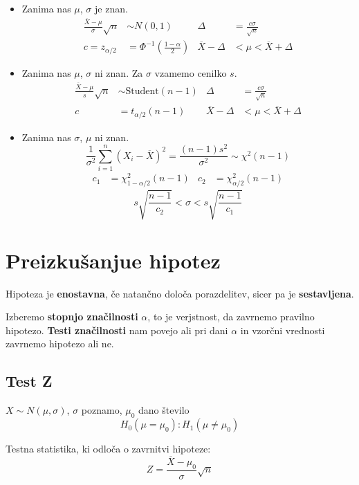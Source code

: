 \begin{multicols}{5}
\begin{itemize}
    \item Zanima nas $\mu$, $\sigma$ je znan.
    \begin{align*}
        \frac{\overline{X} - \mu}{\sigma}\sqrt{n} &\sim N(0, 1) & \Delta &= \frac{c\sigma}{\sqrt{n}} \\
        c = z_{\alpha/2} &= \Phi^{-1}\left(\frac{1-\alpha}{2}\right) & \overline{X} - \Delta &< \mu < \overline{X} + \Delta
    \end{align*}
    \item Zanima nas $\mu$, $\sigma$ ni znan. Za $\sigma$ vzamemo cenilko $s$.
    \begin{align*}
        \frac{\overline{X} - \mu}{s}\sqrt{n} &\sim \text{Student}(n-1) & \Delta &= \frac{c\sigma}{\sqrt{n}} \\
        c &= t_{\alpha/2}(n-1) & \overline{X} - \Delta &< \mu < \overline{X} + \Delta
    \end{align*}
    \item Zanima nas $\sigma$, $\mu$ ni znan.
    \[ \frac{1}{\sigma^2} \sum_{i=1}^n (X_i - \overline{X})^2 = \frac{(n-1)s^2}{\sigma^2} \sim \chi^2(n-1) \]
    \begin{align*}
        c_1 &= \chi^2_{1-\alpha/2}(n-1) & c_2 &= \chi^2_{\alpha/2}(n-1)
    \end{align*}
    \[ s\sqrt{\frac{n-1}{c_2}} < \sigma < s\sqrt{\frac{n-1}{c_1}}\]    
\end{itemize}

\section{Preizkušanjue hipotez}
Hipoteza je \textbf{enostavna}, če natančno določa porazdelitev, sicer pa je \textbf{sestavljena}.

Izberemo \textbf{stopnjo značilnosti} $\alpha$, to je verjstnost, da zavrnemo pravilno hipotezo. \textbf{Testi značilnosti} nam
povejo ali pri dani $\alpha$ in vzorčni vrednosti zavrnemo hipotezo ali ne.

\subsection{Test Z}
$X \sim N(\mu, \sigma)$, $\sigma$ poznamo, $\mu_0$ dano število
\[ H_0(\mu = \mu_0) : H_1(\mu \neq \mu_0)\]

Testna statistika, ki odloča o zavrnitvi hipoteze:
\[ Z = \frac{\overline{X} - \mu_0}{\sigma} \sqrt{n}\]


\end{multicols}
